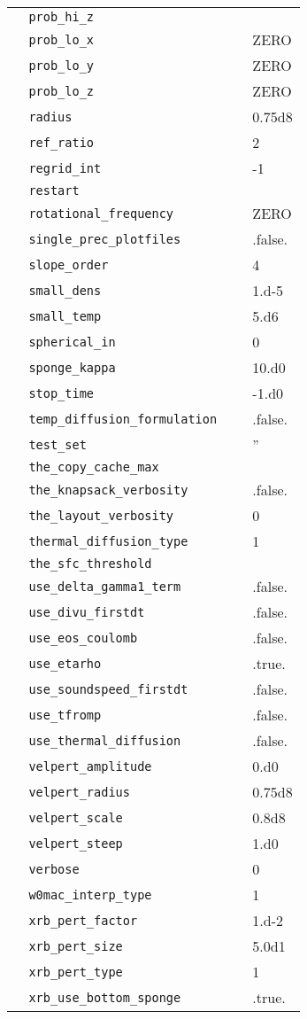 {\begin{center}
\begin{longtable}{|l|p{3.25in}|l|}
\verb=  prob_hi_z =  &   &  \\
\verb=  prob_lo_x =  &   &  ZERO \\
\verb=  prob_lo_y =  &   &  ZERO \\
\verb=  prob_lo_z =  &   &  ZERO \\
\verb=  radius =  &   &  0.75d8 \\
\verb=  ref_ratio =  &   &  2 \\
\verb=  regrid_int =  &   &  -1 \\
\verb=  restart =  &   &  \\
\verb=  rotational_frequency =  &   &  ZERO \\
\verb=  single_prec_plotfiles =  &   &  .false. \\
\verb=  slope_order =  &   &  4 \\
\verb=  small_dens =  &   &  1.d-5 \\
\verb=  small_temp =  &   &  5.d6 \\
\verb=  spherical_in =  &   &  0 \\
\verb=  sponge_kappa =  &   &  10.d0 \\
\verb=  stop_time =  &   &  -1.d0 \\
\verb=  temp_diffusion_formulation =  &   &  .false. \\
\verb=  test_set =  &   &  '' \\
\verb=  the_copy_cache_max =  &   &  \\
\verb=  the_knapsack_verbosity =  &   &  .false. \\
\verb=  the_layout_verbosity =  &   &  0 \\
\verb=  thermal_diffusion_type =  &   &  1 \\
\verb=  the_sfc_threshold =  &   &  \\
\verb=  use_delta_gamma1_term =  &   &  .false. \\
\verb=  use_divu_firstdt =  &   &  .false. \\
\verb=  use_eos_coulomb =  &   &  .false. \\
\verb=  use_etarho =  &   &  .true. \\
\verb=  use_soundspeed_firstdt =  &   &  .false. \\
\verb=  use_tfromp =  &   &  .false. \\
\verb=  use_thermal_diffusion =  &   &  .false. \\
\verb=  velpert_amplitude =  &   &  0.d0 \\
\verb=  velpert_radius =  &   &  0.75d8 \\
\verb=  velpert_scale =  &   &  0.8d8 \\
\verb=  velpert_steep =  &   &  1.d0 \\
\verb=  verbose =  &   &  0 \\
\verb=  w0mac_interp_type =  &   &  1 \\
\verb=  xrb_pert_factor =  &   &  1.d-2 \\
\verb=  xrb_pert_size =  &   &  5.0d1 \\
\verb=  xrb_pert_type =  &   &  1 \\
\verb=  xrb_use_bottom_sponge =  &   &  .true. \\


\end{longtable}
\end{center}}
